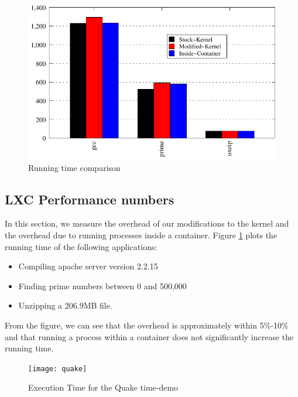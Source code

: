 \begin{figure}[tbh]
\centering
\includegraphics[width=1.0\columnwidth]{perf}
\caption{Running time comparison}
\label{fig:perf}
\end{figure}

\subsection{LXC Performance numbers}
In this section, we measure the overhead of our modifications to the kernel and the overhead due to running processes inside a container. Figure \ref{fig:perf} plots the running time of the following applications:
\begin{itemize}
    \item Compiling apache server version 2.2.15
    \item Finding prime numbers between 0 and 500,000
    \item Unzipping a 206.9MB file.
\end{itemize}
From the figure, we can see that the overhead is approximately within 5\%-10\% and that running a process within a container does not significantly increase the running time.

\begin{figure}[tbh]
\centering
\texttt{[image: quake]}
\caption{Execution Time for the Quake time-demo}
\label{fig:Quake}
\end{figure}

